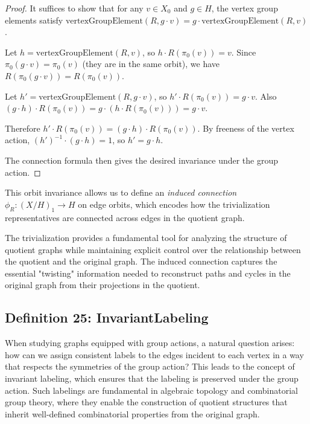 \documentclass[11pt]{article}
\theoremstyle{plain}
\theoremstyle{definition}
\theoremstyle{remark}
\begin{document}
\begin{proof}
It suffices to show that for any $v \in X_0$ and $g \in H$, the vertex group elements satisfy $\text{vertexGroupElement}(R, g \cdot v) = g \cdot \text{vertexGroupElement}(R, v)$.

Let $h = \text{vertexGroupElement}(R, v)$, so $h \cdot R(\pi_0(v)) = v$. Since $\pi_0(g \cdot v) = \pi_0(v)$ (they are in the same orbit), we have $R(\pi_0(g \cdot v)) = R(\pi_0(v))$.

Let $h' = \text{vertexGroupElement}(R, g \cdot v)$, so $h' \cdot R(\pi_0(v)) = g \cdot v$. Also $(g \cdot h) \cdot R(\pi_0(v)) = g \cdot (h \cdot R(\pi_0(v))) = g \cdot v$.

Therefore $h' \cdot R(\pi_0(v)) = (g \cdot h) \cdot R(\pi_0(v))$. By freeness of the vertex action, $(h')^{-1} \cdot (g \cdot h) = 1$, so $h' = g \cdot h$.

The connection formula then gives the desired invariance under the group action.
\end{proof}

This orbit invariance allows us to define an \emph{induced connection} $\phi_R: (X/H)_1 \to H$ on edge orbits, which encodes how the trivialization representatives are connected across edges in the quotient graph.

The trivialization provides a fundamental tool for analyzing the structure of quotient graphs while maintaining explicit control over the relationship between the quotient and the original graph. The induced connection captures the essential "twisting" information needed to reconstruct paths and cycles in the original graph from their projections in the quotient.

\vspace{1em}

\subsection{Definition 25: InvariantLabeling}

When studying graphs equipped with group actions, a natural question arises: how can we assign consistent labels to the edges incident to each vertex in a way that respects the symmetries of the group action? This leads to the concept of invariant labeling, which ensures that the labeling is preserved under the group action. Such labelings are fundamental in algebraic topology and combinatorial group theory, where they enable the construction of quotient structures that inherit well-defined combinatorial properties from the original graph.
\end{document}
